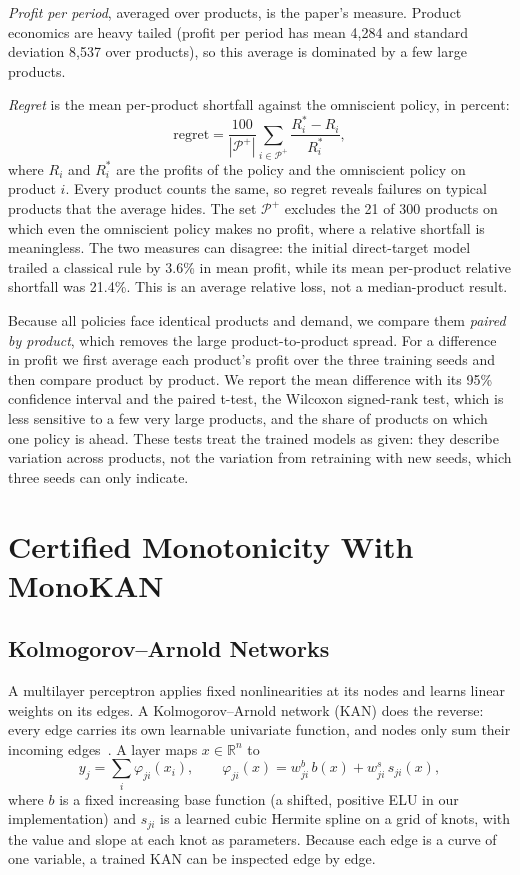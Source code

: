 \documentclass[conference]{IEEEtran}
\begin{document}
\textit{Profit per period}, averaged over products, is the paper's measure. Product economics are heavy tailed
(profit per period has mean 4,284 and standard deviation 8,537 over
products), so this average is dominated by a few large products.

\textit{Regret} is the mean per-product shortfall against the omniscient policy, in percent:
\begin{equation}
\text{regret} = \frac{100}{|\mathcal{P}^+|} \sum_{i \in \mathcal{P}^+} \frac{R_i^* - R_i}{R_i^*},
\label{eq:regret}
\end{equation}
where $R_i$ and $R_i^*$ are the profits of the policy and the omniscient policy on product $i$. Every product counts
the same, so regret reveals failures on typical products that the average hides. The set $\mathcal{P}^+$ excludes the
21 of 300 products on which even the omniscient policy makes no profit, where a relative shortfall is meaningless.
The two measures can disagree: the initial direct-target model trailed a classical rule by 3.6\% in mean profit,
while its mean per-product relative shortfall was 21.4\%. This is an average relative loss, not a median-product result.

Because all policies face identical products and demand, we compare them \emph{paired by product}, which removes the
large product-to-product spread. For a difference in profit we first average each product's profit over the three
training seeds and then compare product by product. We report the mean difference with its 95\% confidence interval
and the paired t-test, the Wilcoxon signed-rank test, which is less sensitive to a few very large products, and the
share of products on which one policy is ahead. These tests treat the trained models as given: they describe variation
across products, not the variation from retraining with new seeds, which three seeds can only indicate.

\section{Certified Monotonicity With MonoKAN}\label{sec:monokan}
\subsection{Kolmogorov--Arnold Networks}\label{sec:kan}
A multilayer perceptron applies fixed nonlinearities at its nodes and learns linear weights on its edges. A
Kolmogorov--Arnold network (KAN) does the reverse: every edge carries its own learnable univariate function, and nodes
only sum their incoming edges~\cite{liu2024}. A layer maps $x \in \mathbb{R}^n$ to
\begin{equation}
y_j = \sum_i \varphi_{ji}(x_i),\qquad \varphi_{ji}(x) = w^{b}_{ji}\, b(x) + w^{s}_{ji}\, s_{ji}(x),
\label{eq:kan}
\end{equation}
where $b$ is a fixed increasing base function (a shifted, positive ELU in our implementation) and $s_{ji}$ is a learned
cubic Hermite spline on a grid of knots, with the value and slope at each knot as parameters. Because each edge is a
curve of one variable, a trained KAN can be inspected edge by edge.
\end{document}

